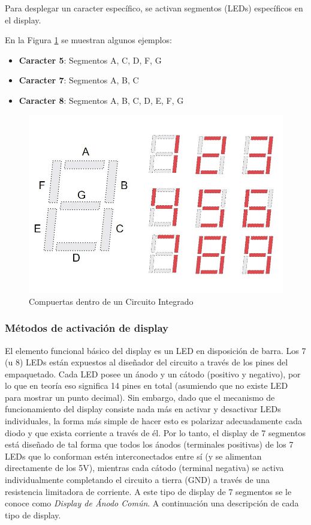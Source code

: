 Para desplegar un caracter específico, se activan segmentos (LEDs) específicos en el display.

En la Figura \ref{Fig:DisplayCharacters} se muestran algunos ejemplos:

\begin{itemize}
    \item \textbf{Caracter 5}: Segmentos A, C, D, F, G
    \item \textbf{Caracter 7}: Segmentos A, B, C
    \item \textbf{Caracter 8}: Segmentos A, B, C, D, E, F, G
\end{itemize}

\begin{figure}[H]
    \centering
    \includegraphics[scale=0.5]{images/DisplayCharacters.JPG}
    \caption{Compuertas dentro de un Circuito Integrado}
    \label{Fig:DisplayCharacters}
\end{figure}

\subsubsection{Métodos de activación de display}
El elemento funcional básico del display es un LED en disposición de barra. Los 7 (u 8) LEDs están expuestos al diseñador del circuito a través
de los pines del empaquetado. Cada LED posee un ánodo y un cátodo (positivo y negativo), por lo que en teoría eso significa 14 pines en total (asumiendo
que no existe LED para mostrar un punto decimal). Sin embargo, dado que el mecanismo de funcionamiento del display consiste nada más en activar y desactivar
LEDs individuales, la forma más simple de hacer esto es polarizar adecuadamente cada diodo y que exista corriente a través de él. Por lo tanto,
el display de 7 segmentos está diseñado de tal forma que todos los ánodos (terminales positivas) de los 7 LEDs que lo conforman
estén interconectados entre sí (y se alimentan directamente de los 5V), mientras cada cátodo (terminal negativa) se activa
individualmente completando el circuito a tierra (GND) a través de una resistencia limitadora de corriente. A este tipo de display de 7 segmentos se le
conoce como \emph{Display de Ánodo Común}. A continuación una descripción de cada tipo de display.

